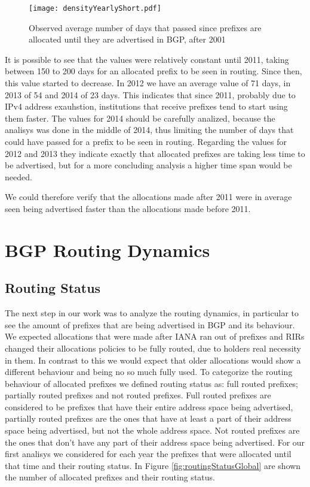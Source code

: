 \documentclass[11pt,a4paper]{scrreprt}
\begin{document}
\begin{figure}[!h]
\centering
\texttt{[image: densityYearlyShort.pdf]}
\caption{Observed average number of days that passed since prefixes are allocated until they are advertised in BGP, after 2001}
\label{fig:densityYearlyShort}
\end{figure}

It is possible to see that the values were relatively constant until 2011, taking between 150 to 200 days for an allocated prefix to be seen in routing. Since then, this value started to decrease. In 2012 we have an average value of 71 days, in 2013 of 54 and 2014 of 23 days. This indicates that since 2011, probably due to IPv4 address exauhstion, institutions that receive prefixes tend to start using them faster. The values for 2014 should be carefully analized, because the analisys was done in the middle of 2014, thus limiting the number of days that could have passed for a prefix to be seen in routing. Regarding the values for 2012 and 2013 they indicate exactly that allocated prefixes are taking less time to be advertised, but for a more concluding analysis a higher time span would be needed.  

We could therefore verify that the allocations made after 2011 were in average seen being advertised faster than the allocations made before 2011.

\section{BGP Routing Dynamics}

\subsection{Routing Status}

The next step in our work was to analyze the routing dynamics, in particular to see the amount of prefixes that are being advertised in BGP and its behaviour. We expected allocations that were made after IANA ran out of prefixes and RIRs changed their allocations policies to be fully routed, due to holders real necessity in them. In contrast to this we would expect that older allocations would show a different behaviour and being no so much fully used.
To categorize the routing behaviour of allocated prefixes we defined routing status as: full routed prefixes; partially routed prefixes and not routed prefixes. Full routed prefixes are considered to be prefixes that have their entire address space being advertised, partially routed prefixes are the ones that have at least a part of their address space being advertised, but not the whole address space. Not routed prefixes are the ones that don't have any part of their address space being advertised. For our first analisys we considered for each year the prefixes that were allocated until that time and their routing status. In Figure \ref{fig:routingStatusGlobal} are shown the number of allocated prefixes and their routing status. 
\end{document}
